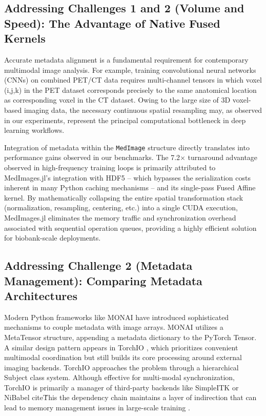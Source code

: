 \documentclass[a4paper,10pt]{elsarticle}
\begin{document}
\subsection*{Addressing Challenges 1 and 2 (Volume and Speed): The Advantage of Native Fused Kernels}
Accurate metadata alignment is a fundamental requirement for contemporary multimodal image analysis. For example, training convolutional neural networks (CNNs) on combined PET/CT data requires multi-channel tensors in which voxel (i,j,k) in the PET dataset corresponds precisely to the same anatomical location as corresponding voxel in the CT dataset. Owing to the large size of 3D voxel-based imaging data, the necessary continuous spatial resampling may, as observed in our experiments, represent the principal computational bottleneck in deep learning workflows. 

Integration of metadata within the \texttt{MedImage} structure directly translates into performance gains observed in our benchmarks. The 7.2$\times$ turnaround advantage observed in high-frequency training loops is primarily attributed to MedImages.jl's integration with HDF5 -- which bypasses the serialization costs inherent in many Python caching mechanisms -- and its single-pass Fused Affine kernel. By mathematically collapsing the entire spatial transformation stack (normalization, resampling, centering, etc.) into a single CUDA execution, MedImages.jl eliminates the memory traffic and synchronization overhead associated with sequential operation queues, providing a highly efficient solution for biobank-scale deployments.

\subsection*{Addressing Challenge 2 (Metadata Management): Comparing Metadata Architectures}
Modern Python frameworks like MONAI \cite{CardosoLi2022} have introduced sophisticated mechanisms to couple metadata with image arrays. MONAI utilizes a MetaTensor structure, appending a metadata dictionary to the PyTorch Tensor. A similar design pattern appears in TorchIO \cite{perezgarcia2021torchio}, which prioritizes convenient multimodal coordination but still builds its core processing around external imaging backends. TorchIO approaches the problem through a hierarchical Subject class system. Although effective for multi-modal synchronization, TorchIO is primarily a manager of third-party backends  like SimpleITK or NiBabel cite\. This the dependency chain maintains a layer of indirection that can lead to memory management issues in large-scale training \cite{perezgarcia2021torchio}.
\end{document}
